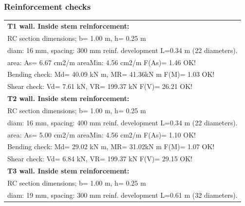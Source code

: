 \subsubsection{Reinforcement checks}

\tablelasttail{\hline}
\begin{center}
\begin{supertabular}{|l|}
\hline
\textbf{T1 wall. Inside stem reinforcement:}\\
  RC section dimensions; b= 1.00 m, h= 0.25 m\\
  diam: 16 mm, spacing: 300 mm  reinf. development L=0.34 m (22 diameters).\\
  area: As=   6.67 cm2/m areaMin:   4.56 cm2/m  F(As)= 1.46 OK!\\
  Bending check: Md=  40.09 kN m, MR=  41.36kN m  F(M)= 1.03 OK!\\
  Shear check: Vd=   7.61 kN,  VR= 199.37 kN  F(V)= 26.21 OK!\\
\hline
\textbf{T2 wall. Inside stem reinforcement:}\\
  RC section dimensions; b= 1.00 m, h= 0.25 m\\
  diam: 16 mm, spacing: 400 mm  reinf. development L=0.34 m (22 diameters).\\
  area: As=   5.00 cm2/m areaMin:   4.56 cm2/m  F(As)= 1.10 OK!\\
  Bending check: Md=  29.02 kN m, MR=  31.02kN m  F(M)= 1.07 OK!\\
  Shear check: Vd=   6.84 kN,  VR= 199.37 kN  F(V)= 29.15 OK!\\
\hline
\textbf{T3 wall. Inside stem reinforcement:}\\
  RC section dimensions; b= 1.00 m, h= 0.25 m\\
  diam: 19 mm, spacing: 300 mm  reinf. development L=0.61 m (32 diameters).\\

\end{supertabular}
\end{center}
